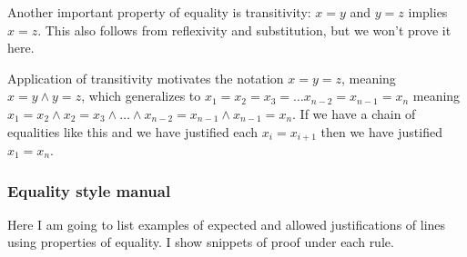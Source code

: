 \documentclass[12pt]{article}
\begin{document}
Another important property of equality is transitivity: $x=y$ and
$y=z$ implies $x=z$.  This also follows from reflexivity and
substitution, but we won't prove it here.

Application of transitivity motivates the notation $x=y=z$, meaning
$x=y \wedge y=z$, which generalizes to $x_1 = x_2 = x_3 = \ldots
x_{n-2} = x_{n-1} = x_n$ meaning $x_1 = x_2 \wedge x_2 = x_3 \wedge
\ldots \wedge x_{n-2} = x_{n-1} \wedge x_{n-1} = x_n$.  If we have a
chain of equalities like this and we have justified each $x_i =
x_{i+1}$ then we have justified $x_1 = x_n$.

\subsubsection{Equality style manual}

Here I am going to list examples of expected and allowed justifications of lines using properties of equality.  I show snippets of proof under each rule.
\end{document}
